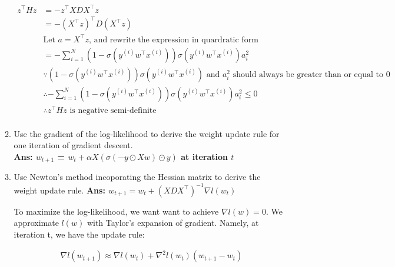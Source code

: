 \documentclass{article}
\theoremstyle{definition}
\theoremstyle{remark}
\begin{document}
\begin{enumerate}[font={\Large\bfseries},left=0pt]
\begin{tcolorbox}
\begin{enumerate}
			      \begin{align}
				      z^\intercal H z & = -z^\intercal X D X^\intercal z                                                                                                                          \\
				                      & = -(X^\intercal z)^\intercal D(X^\intercal z)                                                                                                             \\
				                      & \text{Let } a = X^\intercal z \text{, and rewrite the expression in quardratic form}                                                                      \\
				                      & = -\sum^{N}_{i = 1} (1 - \sigma(y^{(i)}w^\intercal x^{(i)}))\sigma(y^{(i)}w^\intercal x^{(i)}) a_i^2                                                      \\
				                      & \because (1 - \sigma(y^{(i)}w^\intercal x^{(i)}))\sigma(y^{(i)}w^\intercal x^{(i)}) \text{ and }a_i^2 \text{ should always be greater than or equal to 0} \\
				                      & \therefore -\sum^{N}_{i = 1} (1 - \sigma(y^{(i)}w^\intercal x^{(i)}))\sigma(y^{(i)}w^\intercal x^{(i)}) a_i^2 \le 0                                       \\
				                      & \therefore z^\intercal Hz\text{ is negative semi-definite}                                                                                                \\
			      \end{align}

			\item Use the gradient of the log-likelihood to derive the weight update rule for one iteration of gradient descent. \\
			      \textbf{Ans: $w_{t + 1}$ = $w_{t} + \alpha X(\sigma(-y\odot Xw) \odot y)$ at iteration $t$}

			\item Use Newton's method incoporating the Hessian matrix to derive the weight update rule.
			      \textbf{Ans: $w_{t+1} = w_{t} + (XDX^\intercal)^{-1} \nabla l(w_t)$}

			      To maximize the log-likelihood, we want want to achieve $\nabla l(w) = 0$. We approximate $l(w)$ with Taylor's expansion of gradient.
			      Namely, at iteration t, we have the update rule:

			      \begin{align}
				       & \nabla l(w_{t+1}) \approx \nabla l(w_{t}) + \nabla^2 l(w_t)(w_{t+1} - w_t) \\
			      \end{align}


\end{enumerate}
\end{tcolorbox}
\end{enumerate}
\end{document}

